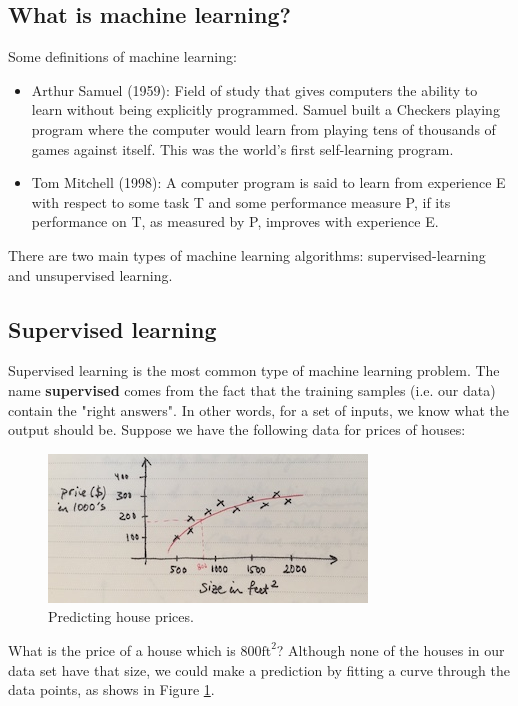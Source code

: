 \documentclass{article}
\theoremstyle{definition}
\begin{document}
\subsection{What is machine learning?}
Some definitions of machine learning:
\begin{itemize}
    \item Arthur Samuel (1959): Field of study that gives computers the ability to learn without being explicitly programmed. Samuel built a Checkers playing program where the computer would learn from playing tens of thousands of games against itself. This was the world's first self-learning program.
    \item Tom Mitchell (1998): A computer program is said to learn from experience E with respect to some task T and some performance measure P, if its performance on T, as measured by P, improves with experience E.
\end{itemize}
There are two main types of machine learning algorithms: supervised-learning and unsupervised learning.

\subsection{Supervised learning}
Supervised learning is the most common type of machine learning problem. The name \textbf{supervised} comes from the fact that the training samples (i.e. our data) contain the "right answers". In other words, for a set of inputs, we know what the output should be. Suppose we have the following data for prices of houses:

\begin{figure}[ht]
\centering
\includegraphics[scale=0.8]{images/intro/house-prices.jpg}
\caption{Predicting house prices.}
\label{into-house-prices}
\end{figure}

What is the price of a house which is $800 \text{ft}^2$? Although none of the houses in our data set have that size, we could make a prediction by fitting a curve through the data points, as shows in Figure \ref{into-house-prices}.
\end{document}
